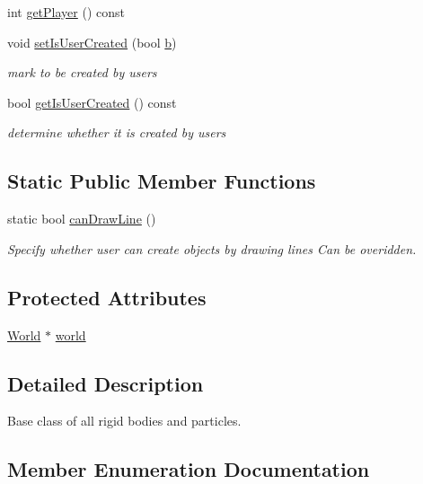 \begin{DoxyCompactItemize}
int \hyperlink{classMatter_a5942bf485f1c095b0abd79ea13239cc7}{get\+Player} () const 
\item 
void \hyperlink{classMatter_a72a6f33a55d6df477dc8e684924bee55}{set\+Is\+User\+Created} (bool \hyperlink{image_8h_ab2d05693952610f937e5acb3c4a8fa1b}{b})
\begin{DoxyCompactList}\small\item\em mark to be created by users \end{DoxyCompactList}\item 
bool \hyperlink{classMatter_ac46cc6630fca6195dc0cd455505a8d84}{get\+Is\+User\+Created} () const 
\begin{DoxyCompactList}\small\item\em determine whether it is created by users \end{DoxyCompactList}\end{DoxyCompactItemize}
\subsection*{Static Public Member Functions}
\begin{DoxyCompactItemize}
\item 
static bool \hyperlink{classMatter_afe85d0688495f35bfe2cf4443c5fc34f}{can\+Draw\+Line} ()
\begin{DoxyCompactList}\small\item\em Specify whether user can create objects by drawing lines Can be overidden. \end{DoxyCompactList}\end{DoxyCompactItemize}
\subsection*{Protected Attributes}
\begin{DoxyCompactItemize}
\item 
\hyperlink{classWorld}{World} $\ast$ \hyperlink{classMatter_abdc5b13e2427e41c45af024acae015f1}{world}
\end{DoxyCompactItemize}


\subsection{Detailed Description}
Base class of all rigid bodies and particles. 

\subsection{Member Enumeration Documentation}
\hypertarget{classMatter_ade1ce1bf81f25377f689d103cd431907}{}
